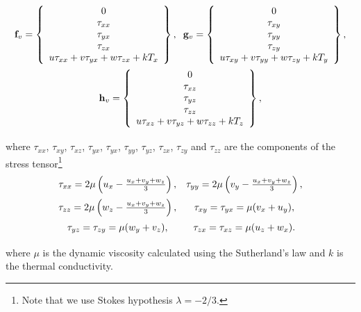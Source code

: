 \begin{equation}
\begin{array}{c} \vspace{0.2 cm}
\mathbf{f}_v =\left\{
\begin{array}{c}
0 \\
\tau_{xx} \\
\tau_{yx} \\
\tau_{zx} \\
u \tau_{xx} + v \tau_{yx} + w \tau_{zx} + k T_x
\end{array} \right\},  \hspace{0.2 cm}
\mathbf{g}_v =\left\{
\begin{array}{c}
0 \\
\tau_{xy} \\
\tau_{yy} \\
\tau_{zy} \\
u \tau_{xy} + v \tau_{yy} + w \tau_{zy} + k T_y
\end{array} \right\}, \\ \vspace{0.2 cm}
\mathbf{h}_v =\left\{
\begin{array}{c}
0 \\
\tau_{xz} \\
\tau_{yz} \\
\tau_{zz} \\
u \tau_{xz} + v \tau_{yz} + w \tau_{zz} + k T_z
\end{array} \right\},
\end{array}
\label{viscous flux}
\end{equation}
where $\tau_{xx}$, $\tau_{xy}$, $\tau_{xz}$, $\tau_{yx}$, $\tau_{yx}$,
$\tau_{yy}$, $\tau_{yz}$, $\tau_{zx}$, $\tau_{zy}$ and $\tau_{zz}$ are
the components of the stress tensor\footnote{Note that we use Stokes
hypothesis $\lambda = -2/3$.}
\begin{equation}
\begin{array}{cc} \vspace{0.2 cm}
\tau_{xx} = 2 \mu \left( u_x - \frac{u_x + v_y + w_z}{3}  \right), &  \tau_{yy} =
2 \mu \left( v_y - \frac{u_x + v_y + w_z}{3}  \right), \\
\vspace{0.2 cm}\tau_{zz} = 2 \mu \left( w_z - \frac{u_x + v_y + w_z}{3}  \right),
& \tau_{xy} = \tau_{yx} = \mu(v_x + u_y), \\
\vspace{0.2 cm} \tau_{yz} = \tau_{zy} = \mu(w_y + v_z),  & \tau_{zx} = \tau_{xz} =
\mu(u_z + w_x). \\
\end{array}
\end{equation}
where $\mu$ is the dynamic viscosity calculated using
the Sutherland's law and $k$ is the thermal conductivity.

